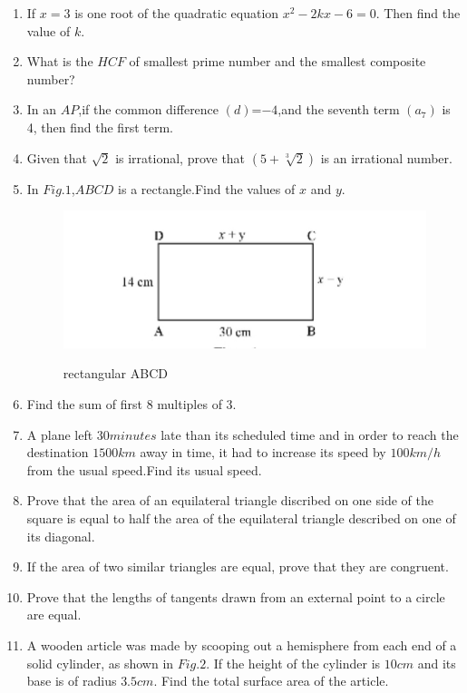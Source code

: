 \documentclass{article}
\begin{document}
\begin{enumerate}
\item If $x=3$ is one root of the quadratic equation $x^2-2kx-6=0$. Then find the value of $k$.
\item What is the $HCF$ of smallest prime number and the smallest composite number?
\item In an $AP$,if the common difference $(d)$=$-4$,and the seventh term $(a_{7})$ is 4, then find the first term.
\item Given that $\sqrt{2}$ is irrational, prove that $(5+\sqrt[3]{2})$ is an irrational number.
\item In $Fig.1$,$ABCD$ is a rectangle.Find the values of $x$ and $y$.
	\begin{figure}[H]
        \includegraphics [width=\columnwidth] {./IMAGE3.jpg}
	\label{fig:fig1}
	\caption{rectangular ABCD}
	\end{figure}
\item Find the sum of first $8$ multiples of $3$.
\item A plane left $30 minutes$ late than its scheduled time and in order to reach the destination $1500km$ away in time, it had to increase its speed by $100km/h$ from the usual speed.Find its usual speed.
\item Prove that the area of an equilateral triangle discribed on one side of the square is equal to half the area of the equilateral triangle described on one of its diagonal.
\item If the area of two similar triangles are equal, prove that they are congruent.
\item Prove that the lengths of tangents drawn from an external point to a circle are equal.
\item A wooden article was made by scooping out a hemisphere from each end of a solid cylinder, as shown in $Fig.2$. If the height of the cylinder is $10cm$ and its base is of radius $3.5cm$. Find the total surface area of the article.
	\begin{figure}[H]

\end{figure}
\end{enumerate}
\end{document}
